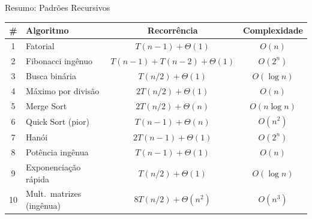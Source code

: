 \documentclass[aspectratio=169]{beamer}
\begin{document}
\begin{frame}{Resumo: Padrões Recursivos}
    \begin{center}
    \renewcommand{\arraystretch}{1.2}
    \footnotesize
    \begin{tabular}{clcc}
        \toprule
        \textbf{\#} & \textbf{Algoritmo} & \textbf{Recorrência} & \textbf{Complexidade} \\
        \midrule
        1  & Fatorial                  & $T(n{-}1) + \Theta(1)$       & $O(n)$ \\
        2  & Fibonacci ingênuo         & $T(n{-}1) + T(n{-}2) + \Theta(1)$ & $O(2^n)$ \\
        3  & Busca binária             & $T(n/2) + \Theta(1)$         & $O(\log n)$ \\
        4  & Máximo por divisão        & $2T(n/2) + \Theta(1)$        & $O(n)$ \\
        5  & Merge Sort                & $2T(n/2) + \Theta(n)$        & $O(n \log n)$ \\
        6  & Quick Sort (pior)         & $T(n{-}1) + \Theta(n)$       & $O(n^2)$ \\
        7  & Hanói                     & $2T(n{-}1) + \Theta(1)$      & $O(2^n)$ \\
        8  & Potência ingênua          & $T(n{-}1) + \Theta(1)$       & $O(n)$ \\
        9  & Exponenciação rápida      & $T(n/2) + \Theta(1)$         & $O(\log n)$ \\
        10 & Mult.\ matrizes (ingênua) & $8T(n/2) + \Theta(n^2)$      & $O(n^3)$ \\
        \bottomrule
    \end{tabular}
    \end{center}
\end{frame}
\end{document}
